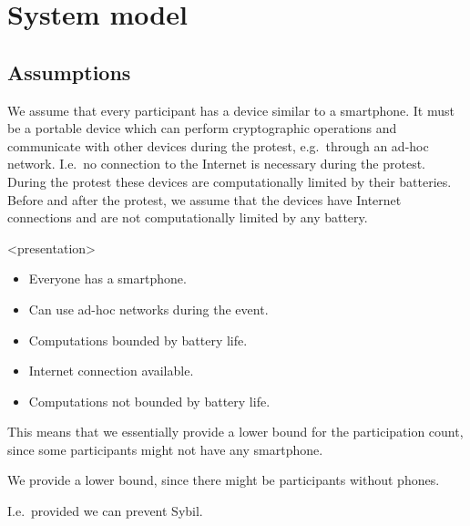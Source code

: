 \mode*

\section{System model}
\label{SystemModel}

\subsection{Assumptions}

We assume that every participant has a device similar to a smartphone.
It must be a portable device which can perform cryptographic operations and 
communicate with other devices during the protest, e.g.\ through an ad-hoc 
network.
I.e.\ no connection to the Internet is necessary during the protest.
During the protest these devices are computationally limited by their 
batteries.
Before and after the protest, we assume that the devices have Internet 
connections and are not computationally limited by any battery.

\begin{frame}<presentation>
  \begin{assumption}
    \begin{itemize}
      \item Everyone has a smartphone.
      \item Can use ad-hoc networks during the event.
      \item Computations bounded by battery life.
    \end{itemize}
  \end{assumption}

  \pause

  \begin{assumption}
    \begin{itemize}
      \item Internet connection available.
      \item Computations not bounded by battery life.
    \end{itemize}
  \end{assumption}
\end{frame}

This means that we essentially provide a lower bound for the participation 
count, since some participants might not have any smartphone.
\begin{frame}
\begin{remark}
  We provide a lower bound, since there might be participants without phones.
\end{remark}
\begin{remark}
  I.e.\ provided we can prevent Sybil.
\end{remark}
\end{frame}

